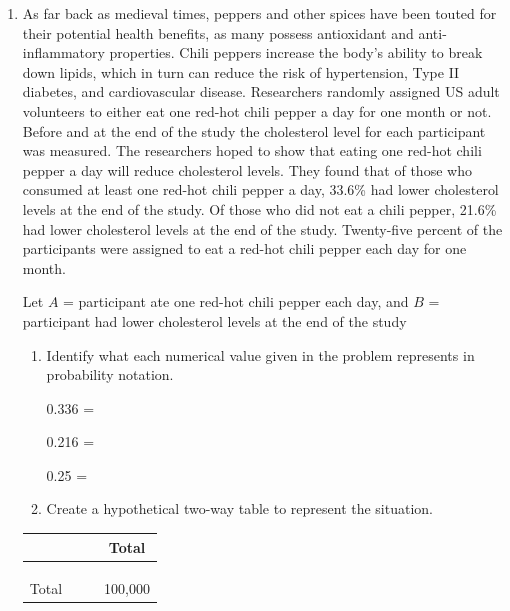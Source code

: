\documentclass[
]{report}
\begin{document}
\begin{enumerate}
\def\labelenumi{\arabic{enumi}.}
\setcounter{enumi}{8}
\item
  As far back as medieval times, peppers and other spices have been touted for their potential health benefits, as many possess antioxidant and anti-inflammatory properties. Chili peppers increase the body's ability to break down lipids, which in turn can reduce the risk of hypertension, Type II diabetes, and cardiovascular disease. Researchers randomly assigned US adult volunteers to either eat one red-hot chili pepper a day for one month or not. Before and at the end of the study the cholesterol level for each participant was measured. The researchers hoped to show that eating one red-hot chili pepper a day will reduce cholesterol levels. They found that of those who consumed at least one red-hot chili pepper a day, 33.6\% had lower cholesterol levels at the end of the study. Of those who did not eat a chili pepper, 21.6\% had lower cholesterol levels at the end of the study. Twenty-five percent of the participants were assigned to eat a red-hot chili pepper each day for one month.
  \vspace{1mm}

  Let \(A\) = participant ate one red-hot chili pepper each day, and \(B\) = participant had lower cholesterol levels at the end of the study
  \vspace{0.1in}

  \begin{enumerate}
  \def\labelenumii{\alph{enumii}.}
  \item
    Identify what each numerical value given in the problem represents in probability notation.
    \vspace{0.1in}

    0.336 =
    \vspace{0.1in}

    0.216 =
    \vspace{0.1in}

    0.25 =
    \vspace{0.1in}
  \item
    Create a hypothetical two-way table to represent the situation.\\
    \vspace{0.1in}
  \end{enumerate}

  \renewcommand{\arraystretch}{1.5}
   \begin{tabular}{cccc} \hline
   \hspace{1in} & \hspace{1in} & \hspace{1in} & Total \\ \hline
   & & & \\ 
   & & & \\ 
   & & & \\ \hline
   Total & & & 100,000 \\ \hline
   \end{tabular}
\end{enumerate}
\end{document}
